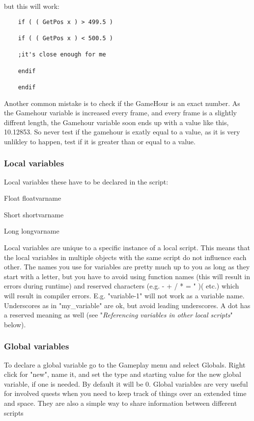 but this will work:

\begin{lstlisting}	
	if ( ( GetPos x ) > 499.5 )
	
	if ( ( GetPos x ) < 500.5 )
	
	;it's close enough for me
	
	endif
	
	endif
\end{lstlisting}

\protect\hypertarget{_Toc182634499}{}{}

Another common mistake is to check if the GameHour is an exact number.
As the Gamehour variable is increased every frame, and every frame is a
slightly diffrent length, the Gamehour variable soon ends up with a
value like this, 10.12853. So never test if the gamehour is exatly equal
to a value, as it is very unlikley to happen, test if it is greater than
or equal to a value.

\hypertarget{local-variables}{%
\subsubsection{Local variables}\label{local-variables}}

Local variables these have to be declared in the script:

	Float floatvarname
	
	Short shortvarname
	
	Long longvarname

Local variables are unique to a specific instance of a local script.
This means that the local variables in multiple objects with the same
script do not influence each other. The names you use for variables are
pretty much up to you as long as they start with a letter, but you have
to avoid using function names (this will result in errors during
runtime) and reserved characters (e.g. - + / * = " )( etc.) which will
result in compiler errors. E.g. "variable-1" will not work as a variable
name. Underscores as in "my\_variable" are ok, but avoid leading
underscores. A dot has a reserved meaning as well (see
"\emph{Referencing variables in other local scripts}" below).

\hypertarget{global-variables}{%
\subsubsection{Global variables}\label{global-variables}}

To declare a global variable go to the Gameplay menu and select Globals.
Right click for "new", name it, and set the type and starting value for
the new global variable, if one is needed. By default it will be 0.
Global variables are very useful for involved quests when you need to
keep track of things over an extended time and space. They are also a
simple way to share information between different scripts

